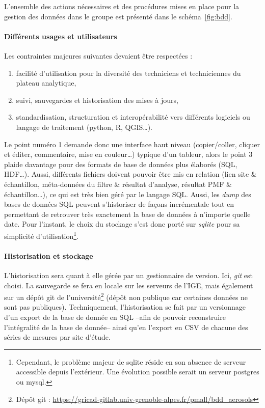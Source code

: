 L'ensemble des actions nécessaires et des procédures mises en place pour la gestion des
données dans le groupe est présenté dans le schéma~\ref{fig:bdd}.

\paragraph{Différents usages et utilisateurs}%
\label{par:différents_usages_et_utilisateurs}

Les contraintes majeures suivantes devaient être respectées :
\begin{enumerate}
    \item facilité d'utilisation pour la diversité des techniciens et techniciennes du
        plateau analytique,
    \item suivi, sauvegardes et historisation des mises à jours,
    \item standardisation, structuration et interopérabilité vers différents logiciels ou
        langage de traitement (python, R, QGIS…).
\end{enumerate}
Le point numéro 1 demande donc une interface haut niveau (copier/coller, cliquer et
éditer, commentaire, mise en couleur…) typique d'un tableur, alors le point 3 plaide
davantage pour des formats de base de données plus élaborés (SQL, HDF…).
Aussi, différents fichiers doivent pouvoir être mis en relation (lien site \&
échantillon, méta-données du
filtre \& résultat d'analyse, résultat PMF \& échantillon…), ce qui est très bien géré
par le langage SQL. Aussi, les \textit{dump} des bases de données SQL peuvent s'historiser
de façons incrémentale tout en permettant de retrouver très exactement la base de données à
n'importe quelle date. 
Pour l'instant, le choix du stockage s'est donc porté sur \textit{sqlite} pour sa
simplicité d'utilisation\footnote{Cependant, le problème majeur de sqlite réside en son
    absence de serveur accessible depuis l'extérieur. Une évolution possible serait un
serveur postgres ou mysql.}.

\paragraph{Historisation et stockage}%
\label{par:historisation_et_stockage}

L'historisation sera quant à elle gérée par un gestionnaire de version. Ici, \textit{git}
est choisi. La sauvegarde se fera en locale sur les serveurs de l'IGE, mais également sur
un dépôt git de l'université\footnote{Dépôt git :
\url{https://gricad-gitlab.univ-grenoble-alpes.fr/pmall/bdd_aerosols}} (dépôt non
publique car certaines données ne sont pas publiques).
Techniquement, l'historisation se fait par un versionnage d'un export de la base de donnée en
SQL --afin de pouvoir reconstruire l'intégralité de la base de donnée-- ainsi qu'en
l'export en CSV de chacune des séries de mesures par site d'étude.

